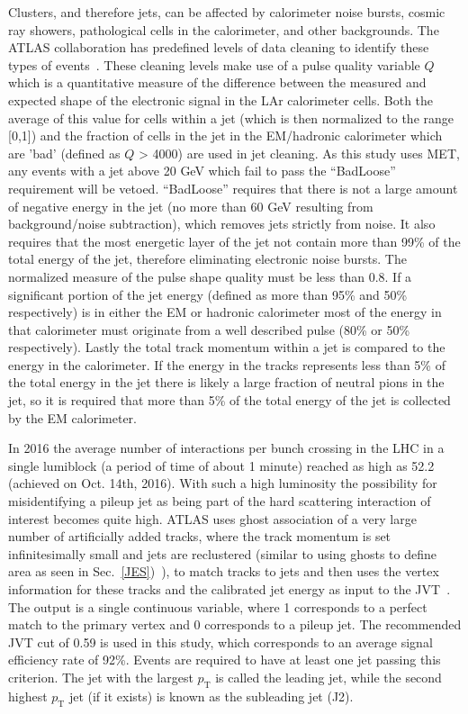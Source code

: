 Clusters, and therefore jets, can be affected by calorimeter noise bursts, cosmic ray showers, pathological cells in the calorimeter, and other backgrounds.  
The ATLAS collaboration has predefined levels of data cleaning to identify these types of events~\cite{ATLAS-CONF-2015-029}.  
These cleaning levels make use of a pulse quality variable $Q$ which is a quantitative measure of the difference between the measured and expected shape of the electronic signal in the LAr calorimeter cells.  
Both the average of this value for cells within a jet (which is then normalized to the range [0,1]) and the fraction of cells in the jet in the EM/hadronic calorimeter which are 'bad' (defined as $Q$ > 4000) are used in jet cleaning.  
As this study uses MET, any events with a jet above 20 GeV which fail to pass the ``BadLoose'' requirement will be vetoed.  
``BadLoose'' requires that there is not a large amount of negative energy in the jet (no more than 60 GeV resulting from background/noise subtraction), which removes jets strictly from noise.   
It also requires that the most energetic layer of the jet not contain more than 99\% of the total energy of the jet, therefore eliminating electronic noise bursts.   
The normalized measure of the pulse shape quality must be less than 0.8.  
If a significant portion of the jet energy (defined as more than 95\% and 50\% respectively) is in either the EM or hadronic calorimeter most of the energy in that calorimeter must originate from a well described pulse (80\% or 50\% respectively).  
Lastly the total track momentum within a jet is compared to the energy in the calorimeter.  
If the energy in the tracks represents less than 5\% of the total energy in the jet there is likely a large fraction of neutral pions in the jet, so it is required that more than 5\% of the total energy of the jet is collected by the EM calorimeter.  

In 2016 the average number of interactions per bunch crossing in the LHC in a single lumiblock (a period of time of about 1 minute) reached as high as 52.2 (achieved on Oct. 14th, 2016).  
With such a high luminosity the possibility for misidentifying a pileup jet as being part of the hard scattering interaction of interest becomes quite high.  
ATLAS uses ghost association of a very large number of artificially added tracks, where the track momentum is set infinitesimally small and jets are reclustered (similar to using ghosts to define area as seen in Sec.~\ref{JES})~\cite{ATLAS-CONF-2013-083}), to match tracks to jets and then uses the vertex information for these tracks and the calibrated jet energy as input to the \gls{JVT}~\cite{ATLAS-CONF-2014-018}.  
The output is a single continuous variable, where 1 corresponds to a perfect match to the primary vertex and 0 corresponds to a pileup jet.  
The recommended JVT cut of 0.59 is used in this study, which corresponds to an average signal efficiency rate of 92\%.  
Events are required to have at least one jet passing this criterion.  
The jet with the largest $p_{\mathrm T}$ is called the leading jet, while the second highest $p_{\mathrm T}$ jet (if it exists) is known as the subleading jet (J2).  

